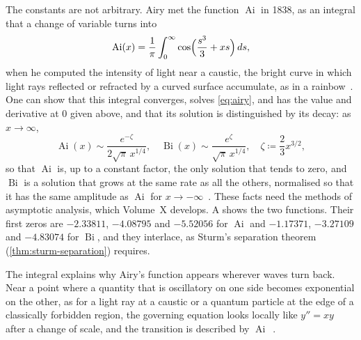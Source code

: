 The constants are not arbitrary. Airy met the function $\operatorname{Ai}$ in 1838, as an integral that a change of variable turns into
\[
\operatorname{Ai}(x)=\frac1\pi\int_0^\infty\cos\Bigl(\frac{s^3}3+xs\Bigr)\,ds ,
\]
when he computed the intensity of light near a caustic, the bright curve in which light rays reflected or refracted by a curved surface accumulate, as in a rainbow~\cite{airy1838}. One can show that this integral converges, solves \eqref{eq:airy}, and has the value and derivative at $0$ given above, and that its solution is distinguished by its decay: as $x\to\infty$,
\[
\operatorname{Ai}(x)\sim\frac{e^{-\zeta}}{2\sqrt\pi\,x^{1/4}},\quad\operatorname{Bi}(x)\sim\frac{e^{\zeta}}{\sqrt\pi\,x^{1/4}},\quad\zeta\coloneqq\frac23x^{3/2},
\]
so that $\operatorname{Ai}$ is, up to a constant factor, the only solution that tends to zero, and $\operatorname{Bi}$ is a solution that grows at the same rate as all the others, normalised so that it has the same amplitude as $\operatorname{Ai}$ for $x\to-\infty$~\cite[Chap.~9]{olver2010nist}. These facts need the methods of asymptotic analysis, which Volume~X develops. A shows the two functions. Their first zeros are $-2.33811$, $-4.08795$ and $-5.52056$ for $\operatorname{Ai}$ and $-1.17371$, $-3.27109$ and $-4.83074$ for $\operatorname{Bi}$, and they interlace, as Sturm's separation theorem (\cref{thm:sturm-separation}) requires.

The integral explains why Airy's function appears wherever waves turn back. Near a point where a quantity that is oscillatory on one side becomes exponential on the other, as for a light ray at a caustic or a quantum particle at the edge of a classically forbidden region, the governing equation looks locally like $y''=xy$ after a change of scale, and the transition is described by $\operatorname{Ai}$~\cite{vallee2004}.

